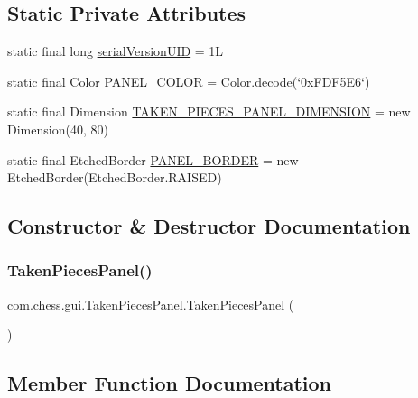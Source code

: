 \subsection*{Static Private Attributes}
\begin{DoxyCompactItemize}
\item 
static final long \mbox{\hyperlink{classcom_1_1chess_1_1gui_1_1_taken_pieces_panel_a48fd4dcc85ac48968dc2423f190391c9}{serial\+Version\+U\+ID}} = 1L
\item 
static final Color \mbox{\hyperlink{classcom_1_1chess_1_1gui_1_1_taken_pieces_panel_a7c6f86f7a7585d2d866fd63f2e100382}{P\+A\+N\+E\+L\+\_\+\+C\+O\+L\+OR}} = Color.\+decode(\char`\"{}0x\+F\+D\+F5\+E6\char`\"{})
\item 
static final Dimension \mbox{\hyperlink{classcom_1_1chess_1_1gui_1_1_taken_pieces_panel_af4712b3ed38c6d0e32d183b10d243f25}{T\+A\+K\+E\+N\+\_\+\+P\+I\+E\+C\+E\+S\+\_\+\+P\+A\+N\+E\+L\+\_\+\+D\+I\+M\+E\+N\+S\+I\+ON}} = new Dimension(40, 80)
\item 
static final Etched\+Border \mbox{\hyperlink{classcom_1_1chess_1_1gui_1_1_taken_pieces_panel_aebc4f1ccb475a398a23a2fb4700e6211}{P\+A\+N\+E\+L\+\_\+\+B\+O\+R\+D\+ER}} = new Etched\+Border(Etched\+Border.\+R\+A\+I\+S\+ED)
\end{DoxyCompactItemize}


\subsection{Constructor \& Destructor Documentation}
\mbox{\label{classcom_1_1chess_1_1gui_1_1_taken_pieces_panel_ac5c360a659746379d05a6ffde442deb2}} 
\subsubsection{\texorpdfstring{TakenPiecesPanel()}{TakenPiecesPanel()}}
{\footnotesize\ttfamily com.\+chess.\+gui.\+Taken\+Pieces\+Panel.\+Taken\+Pieces\+Panel (\begin{DoxyParamCaption}{ }\end{DoxyParamCaption})}



\subsection{Member Function Documentation}
\mbox{\label{classcom_1_1chess_1_1gui_1_1_taken_pieces_panel_ae473357a9f961ce9f8a32d5b222d4319}} 

